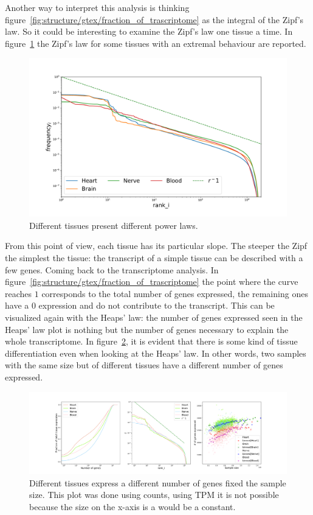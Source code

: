 Another way to interpret this analysis is thinking figure~\ref{fig:structure/gtex/fraction_of_trascriptome} as the integral of the Zipf's law. So it could be interesting to examine the Zipf's law one tissue a time. In figure~\ref{fig:structure/gtex/zipf_tissue} the Zipf's law for some tissues with an extremal behaviour are reported.
\begin{figure}[htb!]
  \centering
  \includegraphics[width=0.8\linewidth]{pictures/structure/gtex/zipf_tissue.pdf}
  \caption{Different tissues present different power laws.}
  \label{fig:structure/gtex/zipf_tissue}
\end{figure}
From this point of view, each tissue has its particular slope. The steeper the Zipf the simplest the tissue: the transcript of a simple tissue can be described with a few genes.
\FloatBarrier
Coming back to the transcriptome analysis. In figure~\ref{fig:structure/gtex/fraction_of_trascriptome} the point where the curve reaches $1$ corresponds to the total number of genes expressed, the remaining ones have a $0$ expression and do not contribute to the transcript. This can be visualized again with the Heaps' law: the number of genes expressed seen in the Heaps' law plot is nothing but the number of genes necessary to explain the whole transcriptome. In figure~\ref{fig:structure/gtex/heaps_tissue}, it is evident that there is some kind of tissue differentiation even when looking at the Heaps' law. In other words, two samples with the same size but of different tissues have a different number of genes expressed.
\begin{figure}[htb!]
  \centering
  \includegraphics[width=0.4\linewidth]{pictures/structure/gtex/heaps_tissue.pdf}
  \caption{Different tissues express a different number of genes fixed the sample size. This plot was done using counts, using TPM it is not possible because the size on the x-axis is a would be a constant.}
  \label{fig:structure/gtex/heaps_tissue}
\end{figure}
